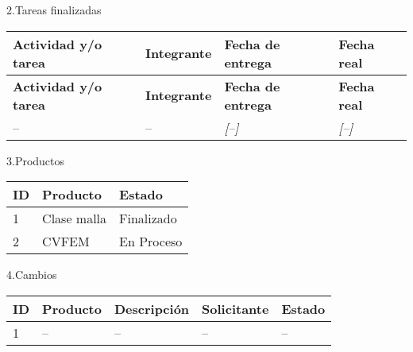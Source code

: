 \documentclass[12pt]{report}
\numberwithin{equation}{section}
\begin{document}
\begin{flushleft}
\large{2.Tareas finalizadas }\\

\begin{longtable}[H]{|m{5cm}|m{3cm}|m{3cm}|m{3cm}|} 
\hline
\small{\textbf{Actividad y/o tarea }} &\small{ \textbf{Integrante}} & \small{\textbf{Fecha de entrega}} & \small{\textbf{Fecha real}}\\
\hline \hline
\endfirsthead

\hline
\small{\textbf{Actividad y/o tarea }} &\small{ \textbf{Integrante}} & \small{\textbf{Fecha de entrega}} & \small{\textbf{Fecha real}}\\
\hline \hline
\endhead
\hline
\endfoot

\endlastfoot
\hline
\hline
\small{--} & \small{--} &\small{ \textit{[--]}} & \small{\textit{[--]}}\\
\hline
\hline
\end{longtable}

\large{3.Productos }
\begin{table}[H]
\begin{tabular}{|m{0.5cm}|m{7.5cm}|m{6cm}|}
\hline 
\textbf{ID } & \textbf{Producto} & \textbf{Estado} \\
\hline
\hline
 1 & \small{Clase malla} & \small{Finalizado}\\
\hline
 2 & \small{CVFEM} & \small{En Proceso}\\
\hline
\end{tabular}
\label{tabla: TABLA CE Productos}
\end{table}
\newpage
\large{4.Cambios}\\

\begin{table}[H]
\begin{tabular}{|m{0.5cm}|m{2cm}|m{4.5cm}|m{3.5cm}|m{3.5cm}|}
\hline 
\textbf{ID} & \textbf{Producto} & \textbf{Descripci\'on} & \textbf{Solicitante} & \textbf{Estado}  \\
\hline
\hline
1 & \small{--}  & \small{--} &\small{--} & \small{--}\\
\hline
\end{tabular}
\label{tabla: TABLA CE Cambios Seg}
\end{table}


\end{flushleft}
\end{document}
